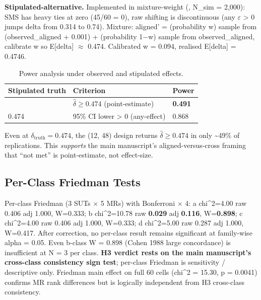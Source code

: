 \documentclass[manuscript,screen,review]{acmart}
\begin{document}
\textbf{Stipulated-alternative.} Implemented in
mixture-weight (,
N\_sim = 2,000): SMS has heavy ties at zero (45/60 = 0), raw shifting is
discontinuous (any $\varepsilon$ \textgreater{} 0 jumps delta from 0.314 to 0.74).
Mixture: aligned' = (probability w) sample from (observed\_aligned +
0.001) + (probability 1$-$w) sample from observed\_aligned, calibrate w so
E{[}delta{]} $\approx$ 0.474. Calibrated w = 0.094, realised E{[}delta{]} =
0.4746.

{%
\begin{longtable}[]{@{}lll@{}}
\caption{Power analysis under observed and stipulated effects.}\label{tab:p2-24}\\
\toprule\noalign{}
Stipulated truth & Criterion & Power \\
\midrule\noalign{}
\endfirsthead
\endhead
\bottomrule\noalign{}
\endlastfoot
0.474 & $\hat{\delta} \geq 0.474$ (point-estimate) & \textbf{0.491} \\
0.474 & 95\% CI lower \textgreater{} 0 (any-effect) & 0.868 \\
\end{longtable}
}

Even at $\delta_{\mathrm{truth}} = 0.474$, the (12, 48) design returns $\hat{\delta} \geq
0.474$ in only \textasciitilde49\% of replications. This
\emph{supports} the main manuscript's aligned-versus-cross framing that ``not met'' is point-estimate, not
effect-size.

\subsection{Per-Class Friedman Tests}\label{d.4-friedman-per-class-discussion-of-small-n-concordance}

Per-class Friedman (3 SUTs $\times$ 5 MRs) with Bonferroni $\times$ 4: a chi\^{}2=4.00
raw 0.406 adj 1.000, W=0.333; b chi\^{}2=10.78 raw \textbf{0.029} adj
\textbf{0.116}, W=\textbf{0.898}; c chi\^{}2=4.00 raw 0.406 adj 1.000,
W=0.333; d chi\^{}2=5.00 raw 0.287 adj 1.000, W=0.417. After correction,
no per-class result remains significant at family-wise alpha = 0.05.
Even b-class W = 0.898 (Cohen 1988 large concordance) is insufficient at
N = 3 per class. \textbf{H3 verdict rests on the main manuscript's cross-class consistency sign test}; per-class
Friedman is sensitivity / descriptive only. Friedman main effect on full
60 cells (chi\^{}2 = 15.30, p = 0.0041) confirms MR rank differences but
is logically independent from H3 cross-class consistency.
\end{document}
